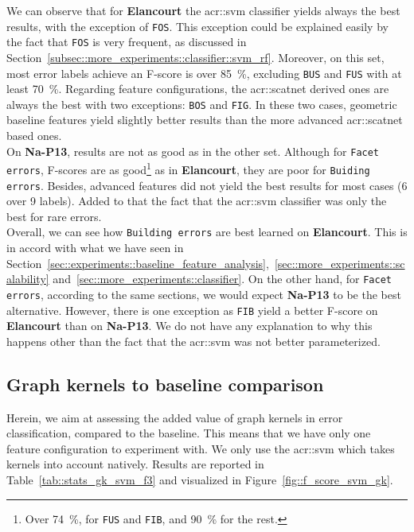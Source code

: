             We can observe that for \textbf{Elancourt} the \gls{acr::svm} classifier yields always the best results, with the exception of \texttt{FOS}.
            This exception could be explained easily by the fact that \texttt{FOS} is very frequent, as discussed in Section~\ref{subsec::more_experiments::classifier::svm_rf}.
            Moreover, on this set, most error labels achieve an F-score is over \SI{85}{\percent}, excluding \texttt{BUS} and \texttt{FUS} with at least \SI{70}{\percent}.
            Regarding feature configurations, the \gls{acr::scatnet} derived ones are always the best with two exceptions: \texttt{BOS} and \texttt{FIG}.
            In these two cases, geometric baseline features yield slightly better results than the more advanced \gls{acr::scatnet} based ones.\\

            On \textbf{Na-P13}, results are not as good as in the other set.
            Although for \texttt{Facet errors}, F-scores are as good\footnote{
                Over \SI{74}{\percent}, for \texttt{FUS} and \texttt{FIB}, and \SI{90}{\percent} for the rest.
            } as in \textbf{Elancourt}, they are poor for \texttt{Buiding errors}.
            Besides, advanced features did not yield the best results for most cases (6 over 9 labels).
            Added to that the fact that the \gls{acr::svm} classifier was only the best for rare errors.\\

            Overall, we can see how \texttt{Building errors} are best learned on \textbf{Elancourt}.
            This is in accord with what we have seen in Section~\ref{sec::experiments::baseline_feature_analysis},~\ref{sec::more_experiments::scalability} and~\ref{sec::more_experiments::classifier}.
            On the other hand, for \texttt{Facet errors}, according to the same sections, we would expect \textbf{Na-P13} to be the best alternative.
            However, there is one exception as \texttt{FIB} yield a better F-score on \textbf{Elancourt} than on \textbf{Na-P13}.
            We do not have any explanation to why this happens other than the fact that the \gls{acr::svm} was not better parameterized.

    \subsection{Graph kernels to baseline comparison}
        \label{subsec::more_experiments::richer_features::graph_kernel_baseline}
        Herein, we aim at assessing the added value of graph kernels in error classification, compared to the baseline.
        This means that we have only one feature configuration to experiment with.
        We only use the \gls{acr::svm} which takes kernels into account natively.
        Results are reported in Table~\ref{tab::stats_gk_svm_f3} and visualized in Figure~\ref{fig::f_score_svm_gk}.\\

